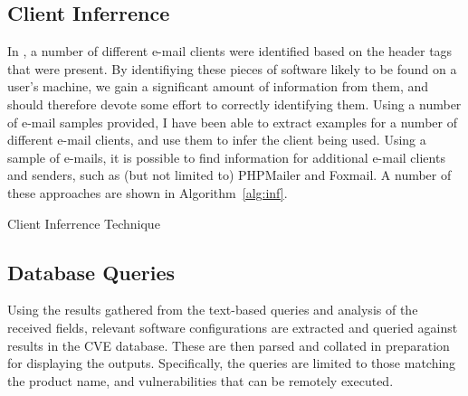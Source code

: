 \subsection{Client Inferrence}

In \cite{nurse2015investigating}, a number of different e-mail clients were identified based on the header tags that were present. By identifiying these pieces of software likely to be found on a user's machine, we gain a significant amount of information from them, and should therefore devote some effort to correctly identifying them.  Using a number of e-mail samples provided, I have been able to extract examples for a number of different e-mail clients, and use them to infer the client being used.  Using a sample of e-mails, it is possible to find information for additional e-mail clients and senders, such as (but not limited to) PHPMailer and Foxmail.  A number of these approaches are shown in Algorithm~\ref{alg:inf}.

\begin{algorithm}
	\caption{Client Inferrence Technique}
	\label{alg:inf}
\end{algorithm}


\subsection{Database Queries}

Using the results gathered from the text-based queries and analysis of the
received fields, relevant software configurations are extracted and queried
against results in the CVE database.  These are then parsed and collated in
preparation for displaying the outputs. Specifically, the queries are limited
to those matching the product name, and vulnerabilities that can be remotely
executed.

